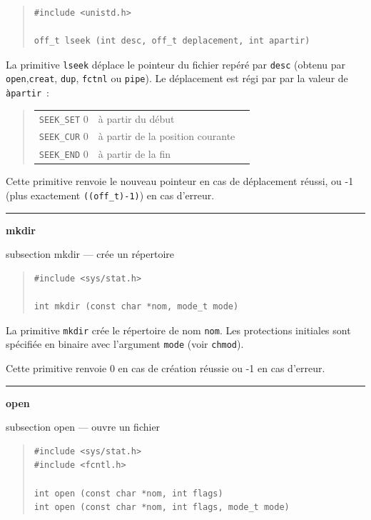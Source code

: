 \documentclass [twoside] {report}
\newcommand {\primitive} [1]
    {
	\phantomsection
	{\large \textbf {#1}}
	\addcontentsline {toc} {subsection} {#1}
    }
\newcommand {\separation}
    {
	\vspace {5mm}
	\nopagebreak
	\hrule
    }
\begin{document}
\begin {quote}
\begin {verbatim}
#include <unistd.h>

off_t lseek (int desc, off_t deplacement, int apartir)
\end{verbatim}
\end {quote}

La primitive \texttt {lseek} déplace le pointeur du
fichier repéré par \texttt {desc} (obtenu par
\texttt {open},\texttt {creat}, \texttt {dup}, \texttt {fctnl} ou \texttt {pipe}).
Le déplacement est régi par par la valeur de
\texttt {àpartir}~:

\begin {quote}
    \begin {tabular} {|lll|} \hline
	\texttt {SEEK\_SET} 0 & à partir du début \\
	\texttt {SEEK\_CUR} 0 & à partir de la position courante \\
	\texttt {SEEK\_END} 0 & à partir de la fin \\ \hline
    \end {tabular}
\end {quote}

Cette primitive renvoie le nouveau pointeur en cas
de déplacement réussi, ou -1 (plus exactement \verb|((off_t)-1)|)
en cas d'erreur.




\separation
\primitive {mkdir} --- crée un répertoire

\begin {quote}
\begin {verbatim}
#include <sys/stat.h>

int mkdir (const char *nom, mode_t mode)
\end{verbatim}
\end {quote}

La primitive \texttt {mkdir} crée le répertoire de nom \texttt {nom}. Les 
protections initiales sont spécifiée en binaire avec l'argument
\texttt {mode} (voir \texttt {chmod}).

Cette primitive renvoie 0 en cas de création réussie
ou -1 en cas d'erreur.




\separation
\primitive {open} --- ouvre un fichier

\begin {quote}
\begin {verbatim}
#include <sys/stat.h>
#include <fcntl.h>

int open (const char *nom, int flags)
int open (const char *nom, int flags, mode_t mode)
\end{verbatim}
\end {quote}
\end{document}
